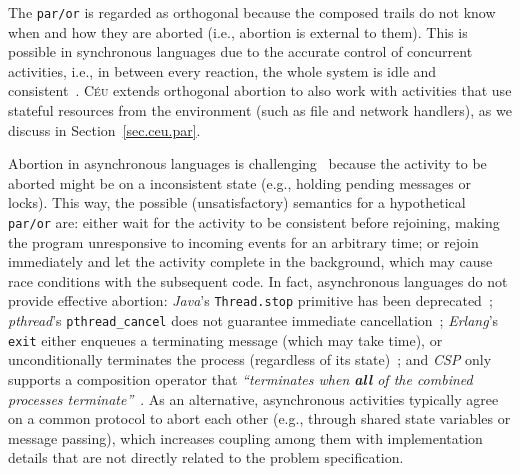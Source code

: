 \documentclass[preprint]{sigplanconf}
\newcommand{\CEU}{\textsc{C\'{e}u}\xspace}
\newcommand{\code}[1] {{\small{\texttt{#1}}}}
\newcommand{\1}{\;}
\newcommand{\2}{\;\;}
\newcommand{\3}{\;\;\;}
\newcommand{\5}{\;\;\;\;\;}
\begin{document}
The \code{par/or} is regarded as orthogonal because the composed trails do not 
know when and how they are aborted (i.e., abortion is external to them).
%
This is possible in synchronous languages due to the accurate control of 
concurrent activities, i.e., in between every reaction, the whole system is 
idle and consistent~\cite{esterel.preemption}.
%
\CEU extends orthogonal abortion to also work with activities that use stateful 
resources from the environment (such as file and network handlers), as we 
discuss in Section~\ref{sec.ceu.par}.


Abortion in asynchronous languages is challenging~\cite{esterel.preemption} 
because the activity to be aborted might be on a inconsistent state (e.g., 
holding pending messages or locks).
%
This way, the possible (unsatisfactory) semantics for a hypothetical 
\code{par/or} are:
either wait for the activity to be consistent before rejoining, making the 
program unresponsive to incoming events for an arbitrary time;
or rejoin immediately and let the activity complete in the background, which 
may cause race conditions with the subsequent code.
%
%
In fact, asynchronous languages do not provide effective abortion:
\emph{Java}'s \code{Thread.stop} primitive has been 
deprecated~\cite{sync_async.threadsstop};
\emph{pthread}'s \code{pthread\_cancel} does not guarantee immediate 
cancellation~\cite{sync_async.pthreadsstop};
\emph{Erlang}'s \code{exit} either enqueues a terminating message (which may 
take time), or unconditionally terminates the process (regardless of its 
state)~\cite{sync_async.erlangstop};
and \emph{CSP} only supports a composition operator that \emph{``terminates 
when \textbf{all} of the combined processes terminate''}~\cite{async.csp}.
%
As an alternative, asynchronous activities typically agree on a common protocol 
to abort each other (e.g., through shared state variables or message passing), 
which increases coupling among them with implementation details that are not 
directly related to the problem specification.
\end{document}
